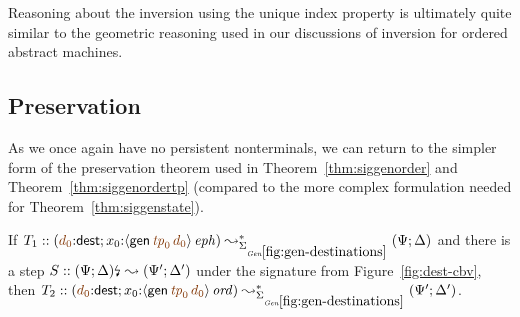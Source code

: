Reasoning about the inversion using the unique index property is
ultimately quite similar to the geometric reasoning used in our
discussions of inversion for ordered abstract machines.

\subsection{Preservation}

As we once again have no persistent nonterminals, we
can return to the simpler form of the preservation theorem used in
Theorem~\ref{thm:siggenorder} and Theorem~\ref{thm:siggenordertp}
(compared to the more complex formulation needed for
Theorem~\ref{thm:siggenstate}).

\medskip
\begin{theorem}
\label{thm:siggendests}
If $T_1 :: (\lf{d_0}{:}{\sf dest}; x_0{:}\iseph{\susp{{\sf gen}\,\lf{{\it tp}_0}\,\lf{d_0}}}) 
   \leadsto^*_{\siggendests} 
   (\Psi; \Delta)$ and there is a step
   $S :: {(\Psi; \Delta)}{\mbox{\lightning}}_{} \leadsto (\Psi'; \Delta')$
under the signature from Figure~\ref{fig:dest-cbv}, then
$T_2 :: (\lf{d_0}{:}{\sf dest}; x_0{:}\istrue{\susp{{\sf gen}\,\lf{{\it tp}_0}\,\lf{d_0}}}) 
   \leadsto^*_{\siggendests} 
   (\Psi'; \Delta')$.
\end{theorem}

